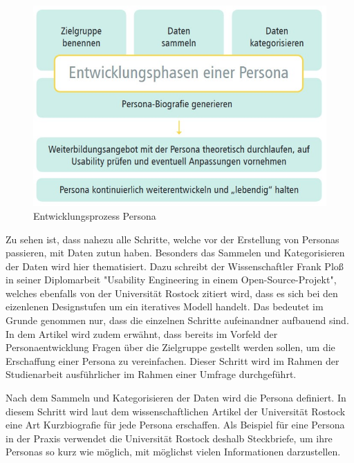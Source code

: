 \begin{figure}[h]
    \centering
    \includegraphics[width=1\textwidth]{images/03/entwicklungPersona.jpg}
    \caption{Entwicklungsprozess Persona \cite{personamethode}}
    \label{personaEntwicklungsPhasen}
\end{figure}

Zu sehen ist, dass nahezu alle Schritte, welche vor der Erstellung von Personas passieren, mit Daten zutun haben. Besonders das Sammelen und Kategorisieren der Daten wird hier thematisiert.\cite{personamethode} Dazu schreibt der Wissenschaftler Frank Ploß in seiner Diplomarbeit "Usability Engineering in einem Open-Source-Projekt", welches ebenfalls von der Universität Rostock zitiert wird, dass es sich bei den eizenlenen Designstufen um ein iteratives Modell handelt.\cite{osp:masterthesis}
Das bedeutet im Grunde genommen nur, dass die einzelnen Schritte aufeinandner aufbauend sind. In dem Artikel wird zudem erwähnt, dass bereits im Vorfeld der Personaentwicklung Fragen über die Zielgruppe gestellt werden sollen, um die Erschaffung einer Persona zu vereinfachen.\cite{personamethode}
Dieser Schritt wird im Rahmen der Studienarbeit ausführlicher im Rahmen einer Umfrage durchgeführt.

Nach dem Sammeln und Kategorisieren der Daten wird die Persona definiert.\cite{personamethode} In diesem Schritt wird laut dem wissenschaftlichen Artikel der Universität Rostock eine Art Kurzbiografie für jede Persona erschaffen.\cite{personamethode} Als Beispiel für eine Persona in der Praxis verwendet die Universität Rostock deshalb Steckbriefe, um ihre Personas so kurz wie möglich, mit möglichst vielen Informationen darzustellen.\cite{personamethode}

